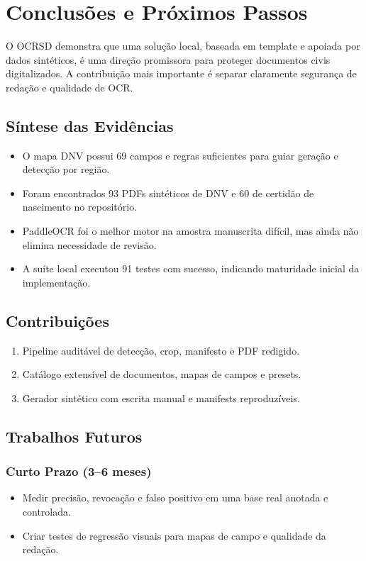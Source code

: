\documentclass[12pt,a4paper]{article}
\begin{document}
\section{Conclusões e Próximos Passos}
\label{sec:conclusoes}

O OCRSD demonstra que uma solução local, baseada em template e apoiada por dados sintéticos, é uma direção promissora para proteger documentos civis digitalizados. A contribuição mais importante é separar claramente segurança de redação e qualidade de OCR.

\subsection{Síntese das Evidências}

\begin{itemize}
    \item{} O mapa DNV possui 69 campos e regras suficientes para guiar geração e detecção por região.
    \item{} Foram encontrados 93 PDFs sintéticos de DNV e 60 de certidão de nascimento no repositório.
    \item{} PaddleOCR foi o melhor motor na amostra manuscrita difícil, mas ainda não elimina necessidade de revisão.
    \item{} A suíte local executou 91 testes com sucesso, indicando maturidade inicial da implementação.
\end{itemize}

\subsection{Contribuições}

\begin{enumerate}
    \item{} Pipeline auditável de detecção, crop, manifesto e PDF redigido.
    \item{} Catálogo extensível de documentos, mapas de campos e presets.
    \item{} Gerador sintético com escrita manual e manifests reproduzíveis.
\end{enumerate}

\subsection{Trabalhos Futuros}

\subsubsection{Curto Prazo (3–6 meses)}
\begin{itemize}
    \item{} Medir precisão, revocação e falso positivo em uma base real anotada e controlada.
    \item{} Criar testes de regressão visuais para mapas de campo e qualidade da redação.
\end{itemize}
\end{document}
